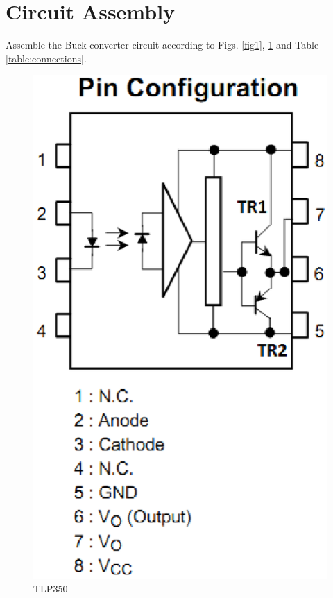 \documentclass[journal,12pt,twocolumn]{IEEEtran}
\begin{document}
\section{Circuit Assembly}
\begin{problem}
Assemble the Buck converter circuit according to Figs. \ref{fig1}, \ref{fig4} and Table \ref{table:connections}.
\end{problem}

\begin{figure}[!h]
\centering
\includegraphics[width=\columnwidth]{./figs/pinout.eps}
\caption{ TLP350}  
\label{fig4}
\end{figure}
\end{document}
